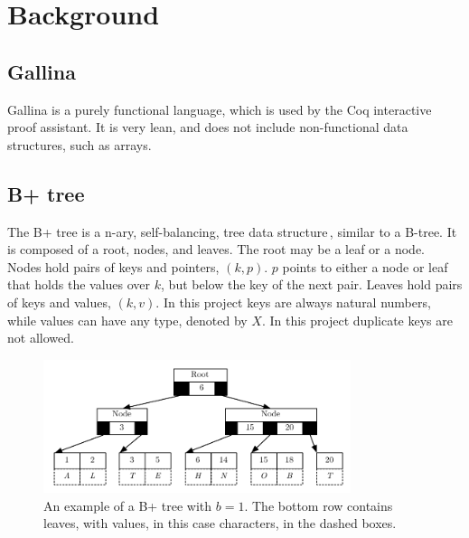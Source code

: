 \section{Background}
\label{sec:Background}

\subsection{Gallina}
Gallina is a purely functional language, which is used by the Coq interactive proof assistant. It is very lean, and does not include non-functional data structures, such as arrays.

\subsection{B+ tree}
\label{subsec:Background_Bplus_tree}
The B+ tree is a n-ary, self-balancing, tree data structure\,\cite[pp. 334]{ramakrishnan2003database}, similar to a B-tree. It is composed of a root, nodes, and leaves. The root may be a leaf or a node. Nodes hold pairs of keys and pointers, $(k, p)$. $p$ points to either a node or leaf that holds the values over $k$, but below the key of the next pair. Leaves hold pairs of keys and values, $(k, v)$. In this project keys are always natural numbers, while values can have any type, denoted by $X$. In this project duplicate keys are not allowed.

\begin{figure}
 \centering
   \includegraphics[width=90mm]{diagrams/BPlusTree.pdf}
 \caption{An example of a B+ tree with $b=1$. The bottom row contains leaves, with values, in this case characters, in the dashed boxes.}
 \label{fig:bplustree}
\end{figure}

